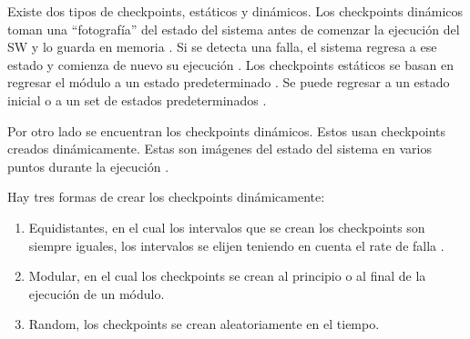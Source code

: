 \begin{comment}
\begin{figure}[h]
  \centering
  \begin{tikzpicture}
  \tikzstyle{cuadro} = [draw, sep=5,rectangle,minimum height=3em, minimum width=6em, node 
  distance=2cm] 

  \tikzstyle{vacio} = [inner, sep=5,rectangle,minimum height=3em, minimum width=6em, node 
  distance=3cm] 

  \tikzstyle{circulo} = [fill, shape=circle, minimum size=5pt, inner sep=3pt, node distance=4cm ]
  
  \node[cuadro] (checkMemo){Memoria de Checkpoint};
  \node[cuadro , below of=checkMemo, pin={[->] left:Entrada}] (modulo){Módulo en ejecución};
  \node[circulo, right of=modulo] (circ){};
  \node[cuadro, below of=circ] (detector){Test de aceptación};
  \node[vacio, right of = circ] (salida){Salida};

  \draw[->] (checkMemo.-30)--(modulo.30);
  \draw[->] (modulo.150) -- (checkMemo.-150);
  \draw[->] (modulo)--(circ);
  \draw[->] (circ)--(salida);
  \draw[->] (circ)--(detector);
  \draw[->] (detector)-|(modulo) node[near end, left] {retry};
  \end{tikzpicture}
  \caption{Representación de checkpoint y restart}
  \label{fig:checkAndRestart}
\end{figure}
 \end{comment}


Existe dos tipos de checkpoints, estáticos y dinámicos. Los checkpoints dinámicos toman una 
``fotografía'' del estado del sistema antes de comenzar la ejecución del \ac{SW} y lo guarda en 
memoria \citep{FTDesign}. Si se detecta una falla, el sistema regresa a ese estado y 
comienza de nuevo su ejecución \citep{FTDesign}. Los checkpoints estáticos se basan en regresar el 
módulo a un estado predeterminado \citep{SoftwareFaultToleranceATutorial}. Se puede regresar a un 
estado inicial o a un set de estados predeterminados \citep{SoftwareFaultToleranceATutorial}.

Por otro lado se encuentran los checkpoints dinámicos. Estos usan checkpoints creados 
dinámicamente. Estas son imágenes del estado del sistema en varios puntos durante la ejecución 
\citep{SoftwareFaultToleranceATutorial}.

Hay tres formas de crear los checkpoints dinámicamente:
\begin{enumerate}
 \item Equidistantes, en el cual los intervalos que se crean los checkpoints son siempre iguales, 
los intervalos se elijen teniendo en cuenta el rate de falla \citep{FTDesign}. 
 \item Modular, en el cual los checkpoints se crean al principio o al final de la ejecución de un 
módulo. 
 \item Random, los checkpoints se crean aleatoriamente en el tiempo. 
\end{enumerate}

